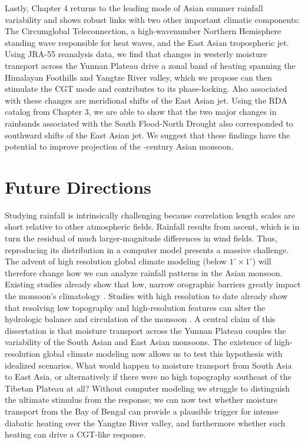 	Lastly, Chapter 4 returns to the leading mode of Asian summer rainfall variability and shows robust links with two other important climatic components: The Circumglobal Teleconnection, a high-wavenumber Northern Hemisphere standing wave responsible for heat waves, and the East Asian tropospheric jet. Using JRA-55 reanalysis data, we find that changes in westerly moisture transport across the Yunnan Plateau drive a zonal band of heating spanning the Himalayan Foothills and Yangtze River valley, which we propose can then stimulate the CGT mode and contributes to its phase-locking. Also associated with these changes are meridional shifts of the East Asian jet. Using the RDA catalog from Chapter 3, we are able to show that the two major changes in rainbands associated with the South Flood-North Drought also corresponded to southward shifts of the East Asian jet. We suggest that these findings have the potential to improve projection of the -century Asian monsoon. 

\section{Future Directions}

	Studying rainfall is intrinsically challenging because correlation length scales are short relative to other atmospheric fields. Rainfall results from ascent, which is in turn the residual of much larger-magnitude differences in wind fields. Thus, reproducing its distribution in a computer model presents a massive challenge. The advent of high resolution global climate modeling (below $1^{\circ} \times 1^{\circ}$) will therefore change how we can analyze rainfall patterns in the  Asian monsoon. Existing studies already show that low, narrow orographic barriers greatly impact the monsoon's climatology \citep{Xie2006}. Studies with high resolution to date already show that resolving low topography and high-resolution features can alter the hydrologic balance and circulation of the monsoon \citep{Risi2010,Boos2013a,Wu2014a,Wu2016}. A central claim of this dissertation is that moisture transport across the Yunnan Plateau couples the variability of the South Asian and East Asian monsoons. The existence of high-resolution global climate modeling now allows us to test this hypothesis with idealized scenarios. What would happen to moisture transport from South Asia to East Asia, or alternatively if there were no high topography southeast of the Tibetan Plateau at all? Without computer modeling we struggle to distinguish the ultimate stimulus from the response; we can now test whether moisture transport from the Bay of Bengal can provide a plausible trigger for intense diabatic heating over the Yangtze River valley, and furthermore whether such heating can drive a CGT-like response.
		
